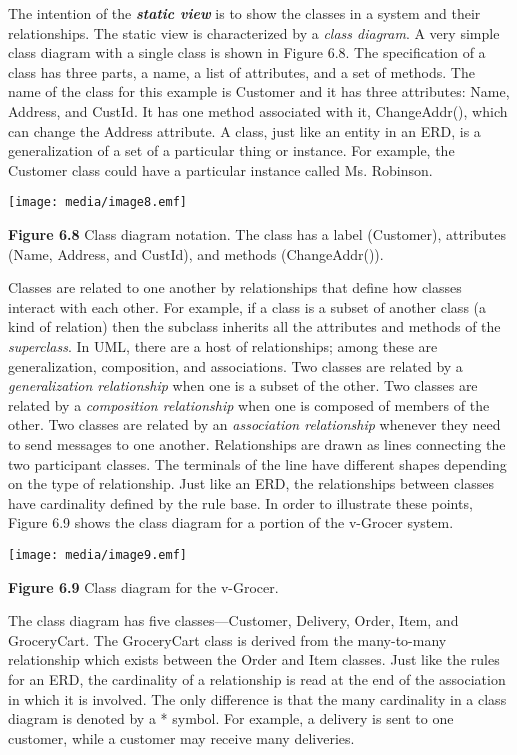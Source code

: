 The intention of the \emph{\textbf{static view}} is to show the classes
in a system and their relationships. The static view is characterized by
a \emph{class diagram}. A very simple class diagram with a single class
is shown in Figure 6.8. The specification of a class has three parts, a
name, a list of attributes, and a set of methods. The name of the class
for this example is Customer and it has three attributes: Name, Address,
and CustId. It has one method associated with it, ChangeAddr(), which
can change the Address attribute. A class, just like an entity in an
ERD, is a generalization of a set of a particular thing or instance. For
example, the Customer class could have a particular instance called Ms.
Robinson.

\texttt{[image: media/image8.emf]}

\textbf{Figure 6.8} Class diagram notation. The class has a label
(Customer), attributes (Name, Address, and CustId), and methods
(ChangeAddr()).

Classes are related to one another by relationships that define how
classes interact with each other. For example, if a class is a subset of
another class (a kind of relation) then the subclass inherits all the
attributes and methods of the \emph{superclass}. In UML, there are a
host of relationships; among these are generalization, composition, and
associations. Two classes are related by a \emph{generalization
relationship} when one is a subset of the other. Two classes are related
by a \emph{composition relationship} when one is composed of members of
the other. Two classes are related by an \emph{association relationship}
whenever they need to send messages to one another. Relationships are
drawn as lines connecting the two participant classes. The terminals of
the line have different shapes depending on the type of relationship.
Just like an ERD, the relationships between classes have cardinality
defined by the rule base. In order to illustrate these points, Figure
6.9 shows the class diagram for a portion of the v-Grocer system.

\texttt{[image: media/image9.emf]}

\textbf{Figure 6.9} Class diagram for the v-Grocer.

The class diagram has five classes---Customer, Delivery, Order, Item,
and GroceryCart. The GroceryCart class is derived from the many-to-many
relationship which exists between the Order and Item classes. Just like
the rules for an ERD, the cardinality of a relationship is read at the
end of the association in which it is involved. The only difference is
that the many cardinality in a class diagram is denoted by a * symbol.
For example, a delivery is sent to one customer, while a customer may
receive many deliveries.

